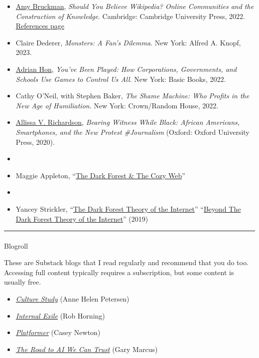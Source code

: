 \documentclass[
  letterpaper,
  DIV=11,
  numbers=noendperiod,
  oneside]{scrartcl}
\makeatletter
\let\oldparagraph\paragraph
\renewcommand{\paragraph}{
    \@ifstar
      \xxxParagraphStar
      \xxxParagraphNoStar
  }
\newcommand{\xxxParagraphStar}[1]{\oldparagraph*{#1}\mbox{}}
\newcommand{\xxxParagraphNoStar}[1]{\oldparagraph{#1}\mbox{}}
\makeatother
\begin{document}
\begin{itemize}
\item
  \href{https://en.wikipedia.org/wiki/Amy_S._Bruckman}{Amy Bruckman},
  \emph{Should You Believe Wikipedia? Online Communities and the
  Construction of Knowledge}. Cambridge: Cambridge University Press,
  2022. \href{bruckman-refs.html}{References page}
\item
  Claire Dederer, \emph{Monsters: A Fan's Dilemma}. New York: Alfred A.
  Knopf, 2023.
\item
  \href{https://mssv.net/}{Adrian Hon}, \emph{You've Been Played: How
  Corporations, Governments, and Schools Use Games to Control Us All}.
  New York: Basic Books, 2022.
\item
  Cathy O'Neil, with Stephen Baker, \emph{The Shame Machine: Who Profits
  in the New Age of Humiliation}. New York: Crown/Random House, 2022.
\item
  \href{https://allissavrichardson.com}{Allissa V. Richardson},
  \emph{Bearing Witness While Black: African Americans, Smartphones, and
  the New Protest \#Journalism} (Oxford: Oxford University Press, 2020).
\item
\item
  Maggie Appleton, ``\href{https://maggieappleton.com/cozy-web}{The Dark
  Forest \& The Cozy Web}''
\item
\item
  Yancey Strickler,
  ``\href{./courses/2006120/files/160840626?wrap=1}{The Dark Forest
  Theory of the Internet}''
  ``\href{./courses/2006120/files/160840646?wrap=1}{Beyond The Dark
  Forest Theory of the Internet}'' (2019)
\end{itemize}

\begin{center}\rule{0.5\linewidth}{0.5pt}\end{center}

\paragraph{Blogroll}\label{blogroll}

These are Substack blogs that I read regularly and recommend that you do
too. Accessing full content typically requires a subscription, but some
content is usually free.

\begin{itemize}
\item
  \href{https://annehelen.substack.com/}{\emph{Culture Study}} (Anne
  Helen Petersen)
\item
  \href{https://robhorning.substack.com/}{\emph{Internal Exile}} (Rob
  Horning)
\item
  \href{https://www.platformer.news/}{\emph{Platformer}} (Casey Newton)
\item
  \href{https://garymarcus.substack.com/}{\emph{The Road to AI We Can
  Trust}} (Gary Marcus)
\end{itemize}
\end{document}
